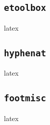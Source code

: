 \documentclass{article}
\begin{document}
\subsection{\texttt{etoolbox}}
\begin{imtaCode}{latex}
\RequirePackage{etoolbox}
\end{imtaCode}

\subsection{\texttt{hyphenat}}
\begin{imtaCode}{latex}
\RequirePackage[none]{hyphenat}
\end{imtaCode}

\subsection{\texttt{footmisc}}
\begin{imtaCode}{latex}
\RequirePackage[bottom]{footmisc}
\end{imtaCode}

\end{document}
